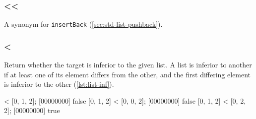 \subsubsection{\textless\textless}

A synonym for \lstinline|insertBack| (\autoref{sec:std-list-pushback}).

\subsubsection{\textless}

Return whether the target is inferior to the given list. A list is
inferior to another if at least one of its element differs from the
other, and the first differing element is inferior to the other
(\autoref{lst:list-inf}).

\begin{urbiscript}[caption={List.'<'}, label=lst:list-inf,
  float=\floatpos]
[0, 1, 2] < [0, 1, 2];
[00000000] false
[0, 1, 2] < [0, 0, 2];
[00000000] false
[0, 1, 2] < [0, 2, 2];
[00000000] true
\end{urbiscript}


